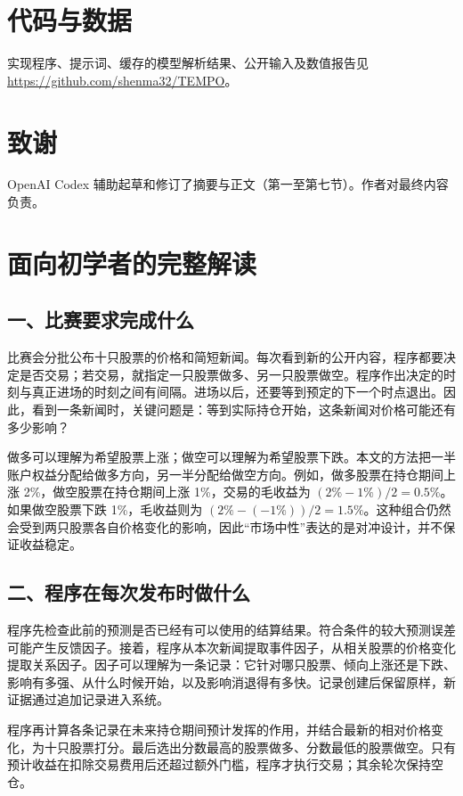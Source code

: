\documentclass[conference]{IEEEtran}
\begin{document}
\FloatBarrier

\section*{代码与数据}
实现程序、提示词、缓存的模型解析结果、公开输入及数值报告见 \url{https://github.com/shenma32/TEMPO}。

\section*{致谢}
OpenAI Codex 辅助起草和修订了摘要与正文（第一至第七节）。作者对最终内容负责。



\clearpage
\section*{面向初学者的完整解读}

\subsection*{一、比赛要求完成什么}
比赛会分批公布十只股票的价格和简短新闻。每次看到新的公开内容，程序都要决定是否交易；若交易，就指定一只股票做多、另一只股票做空。程序作出决定的时刻与真正进场的时刻之间有间隔。进场以后，还要等到预定的下一个时点退出。因此，看到一条新闻时，关键问题是：等到实际持仓开始，这条新闻对价格可能还有多少影响？

做多可以理解为希望股票上涨；做空可以理解为希望股票下跌。本文的方法把一半账户权益分配给做多方向，另一半分配给做空方向。例如，做多股票在持仓期间上涨 2\%，做空股票在持仓期间上涨 1\%，交易的毛收益为 $(2\%-1\%)/2=0.5\%$。如果做空股票下跌 1\%，毛收益则为 $(2\%-(-1\%))/2=1.5\%$。这种组合仍然会受到两只股票各自价格变化的影响，因此“市场中性”表达的是对冲设计，并不保证收益稳定。

\subsection*{二、程序在每次发布时做什么}
程序先检查此前的预测是否已经有可以使用的结算结果。符合条件的较大预测误差可能产生反馈因子。接着，程序从本次新闻提取事件因子，从相关股票的价格变化提取关系因子。因子可以理解为一条记录：它针对哪只股票、倾向上涨还是下跌、影响有多强、从什么时候开始，以及影响消退得有多快。记录创建后保留原样，新证据通过追加记录进入系统。

程序再计算各条记录在未来持仓期间预计发挥的作用，并结合最新的相对价格变化，为十只股票打分。最后选出分数最高的股票做多、分数最低的股票做空。只有预计收益在扣除交易费用后还超过额外门槛，程序才执行交易；其余轮次保持空仓。
\end{document}
